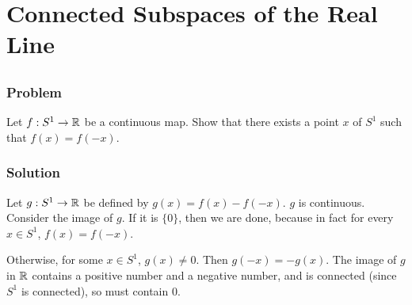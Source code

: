 \setcounter{section}{23} %
\section{Connected Subspaces of the Real Line}
\label{sec-connected-subspaces-real}


\setcounter{subsection}{1} %
\subsection{}

\subsubsection{Problem}
Let $f : S^1 \to \mathbb R$ be a continuous map. Show that there exists a point $x$ of $S^1$ such that $f(x) = f(-x)$.

\subsubsection{Solution}
Let $g : S^1 \to \mathbb R$ be defined by $g(x) = f(x) - f(-x)$. $g$ is continuous. Consider the image of $g$. If it is $\{0\}$, then we are done, because in fact for every $x \in S^1$, $f(x) = f(-x)$.

Otherwise, for some $x \in S^1$, $g(x) \neq 0$. Then $g(-x) = -g(x)$. The image of $g$ in $\mathbb R$ contains a positive number and a negative number, and is connected (since $S^1$ is connected), so must contain $0$.
